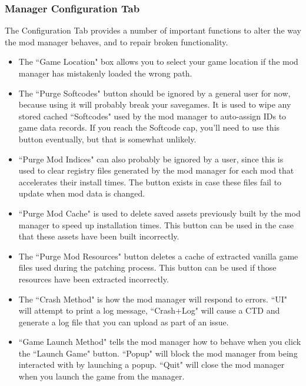 \documentclass{article}
\begin{document}
\subsubsection{Manager Configuration Tab}
The Configuration Tab provides a number of important functions to alter the way the mod manager behaves, and to repair broken functionality.
\begin{itemize}

\item The ``Game Location" box allows you to select your game location if the mod manager has mistakenly loaded the wrong path. 

\item The ``Purge Softcodes" button should be ignored by a general user for now, because using it will probably break your savegames. It is used to wipe any stored cached ``Softcodes" used by the mod manager to auto-assign IDs to game data records.  If you reach the Softcode cap, you'll need to use this button eventually, but that is somewhat unlikely.

\item ``Purge Mod Indices" can also probably be ignored by a user, since this is used to clear registry files generated by the mod manager for each mod that accelerates their install times. The button exists in case these files fail to update when mod data is changed. 

\item ``Purge Mod Cache" is used to delete saved assets previously built by the mod manager to speed up installation times. This button can be used in the case that these assets have been built incorrectly. 

\item The ``Purge Mod Resources" button deletes a cache of extracted vanilla game files used during the patching process. This button can be used if those resources have been extracted incorrectly.

\item The ``Crash Method" is how the mod manager will respond to errors. ``UI" will attempt to print a log message, ``Crash+Log" will cause a CTD and generate a log file that you can upload as part of an issue. 

\item ``Game Launch Method" tells the mod manager how to behave when you click the ``Launch Game" button. ``Popup" will block the mod manager from being interacted with by launching a popup. ``Quit" will close the mod manager when you launch the game from the manager.
\end{itemize}
\end{document}
